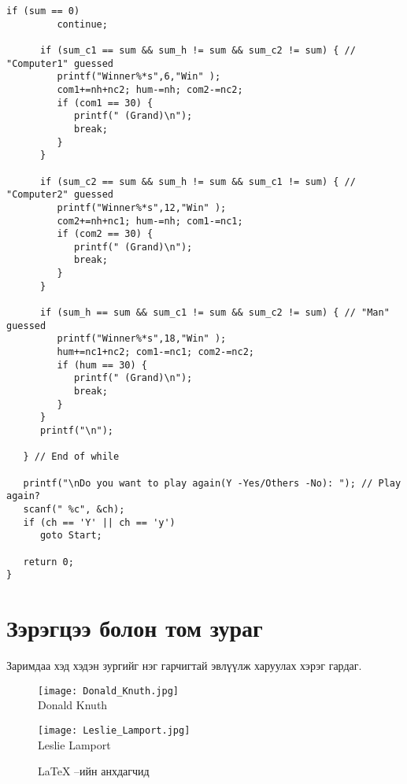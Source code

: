 \begin{lstlisting}[label=some-code,caption=Уламжлалт монгол тоглоом \enquote{Чулуу таалцах}]
      if (sum == 0)
         continue;

      if (sum_c1 == sum && sum_h != sum && sum_c2 != sum) { // "Computer1" guessed
         printf("Winner%*s",6,"Win" );
         com1+=nh+nc2; hum-=nh; com2-=nc2;
         if (com1 == 30) {
            printf(" (Grand)\n");
            break;
         }
      }

      if (sum_c2 == sum && sum_h != sum && sum_c1 != sum) { // "Computer2" guessed
         printf("Winner%*s",12,"Win" );
         com2+=nh+nc1; hum-=nh; com1-=nc1;
         if (com2 == 30) {
            printf(" (Grand)\n");
            break;
         }
      }

      if (sum_h == sum && sum_c1 != sum && sum_c2 != sum) { // "Man" guessed
         printf("Winner%*s",18,"Win" );
         hum+=nc1+nc2; com1-=nc1; com2-=nc2;
         if (hum == 30) {
            printf(" (Grand)\n");
            break;
         }
      }
      printf("\n");

   } // End of while

   printf("\nDo you want to play again(Y -Yes/Others -No): "); // Play again?
   scanf(" %c", &ch);
   if (ch == 'Y' || ch == 'y')
      goto Start;

   return 0;
}

\end{lstlisting}


\section{Зэрэгцээ болон том зураг}

Заримдаа хэд хэдэн зургийг нэг гарчигтай эвлүүлж харуулах хэрэг гардаг. 
\begin{figure} [!h]
\centering
\begin{minipage}{.5\textwidth}
	\centering
	\texttt{[image: Donald\_Knuth.jpg]}\\
	{Donald Knuth}
	\label{fig:knuth}
\end{minipage}%
\begin{minipage}{.5\textwidth}
	\centering
	\texttt{[image: Leslie\_Lamport.jpg]}\\
	{Leslie Lamport}
	\label{fig:lamport}
\end{minipage}
\caption{\LaTeX{} --ийн анхдагчид}
\end{figure}

